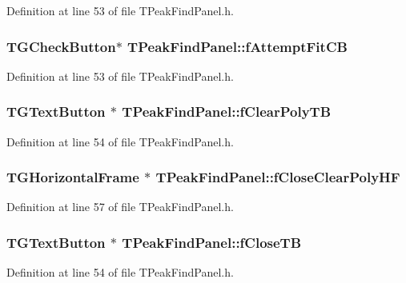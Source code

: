 Definition at line 53 of file TPeakFindPanel.h.
\subsubsection[{fAttemptFitCB}]{\setlength{\rightskip}{0pt plus 5cm}TGCheckButton$\ast$ {\bf TPeakFindPanel::fAttemptFitCB}\hspace{0.3cm}{\ttfamily  [private]}}\label{classTPeakFindPanel_a3c863a7594284859aefa215d968d3ac1}


Definition at line 53 of file TPeakFindPanel.h.
\subsubsection[{fClearPolyTB}]{\setlength{\rightskip}{0pt plus 5cm}TGTextButton $\ast$ {\bf TPeakFindPanel::fClearPolyTB}\hspace{0.3cm}{\ttfamily  [private]}}\label{classTPeakFindPanel_a59d69b23e15ca787e68757914d33c6b0}


Definition at line 54 of file TPeakFindPanel.h.
\subsubsection[{fCloseClearPolyHF}]{\setlength{\rightskip}{0pt plus 5cm}TGHorizontalFrame $\ast$ {\bf TPeakFindPanel::fCloseClearPolyHF}\hspace{0.3cm}{\ttfamily  [private]}}\label{classTPeakFindPanel_a22bfd871341ca3b3ece3e4682531414f}


Definition at line 57 of file TPeakFindPanel.h.
\subsubsection[{fCloseTB}]{\setlength{\rightskip}{0pt plus 5cm}TGTextButton $\ast$ {\bf TPeakFindPanel::fCloseTB}\hspace{0.3cm}{\ttfamily  [private]}}\label{classTPeakFindPanel_a3e84f92a878fc6810a25ea4f116e8a1c}


Definition at line 54 of file TPeakFindPanel.h.
